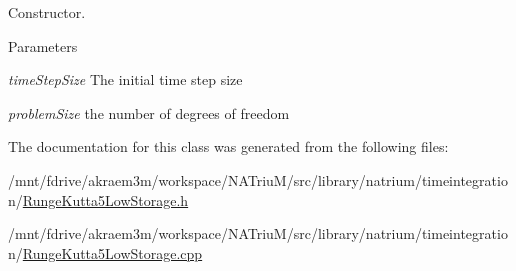 Constructor. 
\begin{DoxyParams}{Parameters}
\item[{\em timeStepSize}]The initial time step size \item[{\em problemSize}]the number of degrees of freedom \end{DoxyParams}


The documentation for this class was generated from the following files:\begin{DoxyCompactItemize}
\item 
/mnt/fdrive/akraem3m/workspace/NATriuM/src/library/natrium/timeintegration/\hyperlink{RungeKutta5LowStorage_8h}{RungeKutta5LowStorage.h}\item 
/mnt/fdrive/akraem3m/workspace/NATriuM/src/library/natrium/timeintegration/\hyperlink{RungeKutta5LowStorage_8cpp}{RungeKutta5LowStorage.cpp}\end{DoxyCompactItemize}
